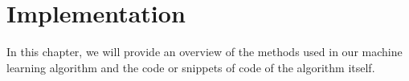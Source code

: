 \chapter{Implementation}
\label{kap:implementation}

In this chapter, we will provide an overview of the methods used in our machine learning algorithm and the code or snippets of code of the algorithm itself.